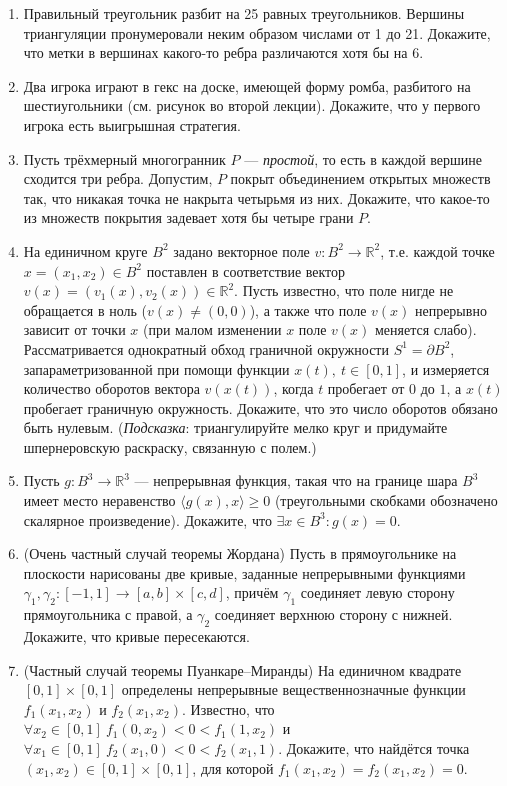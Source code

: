 \documentclass[12pt]{article}
\def\ra{\rightarrow}
\def\RR{\mathbb{R}}
\begin{document}
\begin{enumerate}
  \item Правильный треугольник разбит на 25 равных треугольников. Вершины триангуляции пронумеровали неким образом числами от 1 до 21. Докажите, что метки в вершинах какого-то ребра различаются хотя бы на 6.

  \item Два игрока играют в гекс на доске, имеющей форму ромба, разбитого на шестиугольники (см. рисунок во второй лекции). Докажите, что у первого игрока есть выигрышная стратегия.

  \item Пусть трёхмерный многогранник $P$ --- \emph{простой}, то есть в каждой вершине сходится три ребра. Допустим, $P$ покрыт объединением открытых множеств так, что никакая точка не накрыта четырьмя из них. Докажите, что какое-то из множеств покрытия задевает хотя бы четыре грани $P$.

  \item На единичном круге $B^2$ задано векторное поле $v: B^2 \ra \RR^2$, т.е. каждой точке $x = (x_1,x_2) \in B^2$ поставлен в соответствие вектор $v(x) = (v_1(x), v_2(x)) \in \RR^2$. Пусть известно, что поле нигде не обращается в ноль ($v(x) \neq (0,0)$), а также что поле $v(x)$ непрерывно зависит от точки $x$ (при малом изменении $x$ поле $v(x)$ меняется слабо). Рассматривается однократный обход граничной окружности $S^1 = \partial B^2$, запараметризованной при помощи функции $x(t), \ t\in[0,1]$, и измеряется количество оборотов вектора $v(x(t))$, когда $t$ пробегает от $0$ до $1$, а $x(t)$ пробегает граничную окружность. Докажите, что это число оборотов обязано быть нулевым.
  (\emph{Подсказка}: триангулируйте мелко круг и придумайте шпернеровскую раскраску, связанную с полем.)

  \item Пусть $g : B^3 \ra \RR^3$ --- непрерывная функция, такая что на границе шара $B^3$ имеет место неравенство $\langle g(x),x \rangle \geqslant 0$ (треугольными скобками обозначено скалярное произведение). Докажите, что $\exists x \in B^3 : g(x)=0$.

  \item (Очень частный случай теоремы Жордана) Пусть в прямоугольнике на плоскости нарисованы две кривые, заданные непрерывными функциями $\gamma_1, \gamma_2: [-1,1] \to [a,b]\times [c,d]$, причём $\gamma_1$ соединяет левую сторону прямоугольника с правой, а $\gamma_2$ соединяет верхнюю сторону с нижней. Докажите, что кривые пересекаются.

  \item (Частный случай теоремы Пуанкаре--Миранды) На единичном квадрате $[0,1]\times[0,1]$ определены непрерывные вещественнозначные функции $f_1(x_1, x_2)$ и $ f_2(x_1, x_2)$. Известно, что $\forall x_2\in[0,1] \ f_1(0,x_2) < 0 < f_1(1,x_2)$ и $\forall x_1\in[0,1] \ f_2(x_1,0) < 0 < f_2(x_1,1)$. Докажите, что найдётся точка $(x_1, x_2) \in [0,1]\times[0,1]$, для которой $f_1(x_1, x_2) = f_2(x_1, x_2) = 0$.


\end{enumerate}
\end{document}

